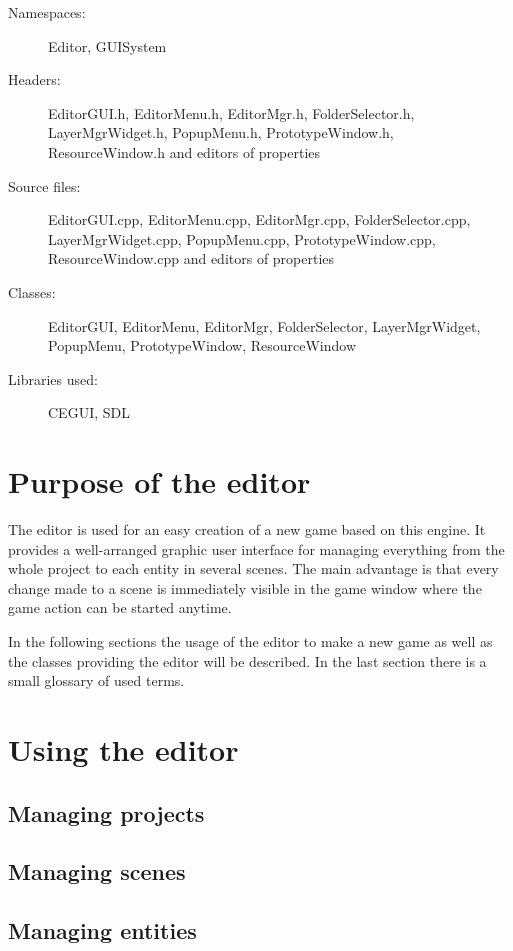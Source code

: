 \begin{description}
  \item[Namespaces:] Editor, GUISystem
  \item[Headers:] EditorGUI.h, EditorMenu.h, EditorMgr.h, FolderSelector.h, LayerMgrWidget.h, PopupMenu.h, PrototypeWindow.h, ResourceWindow\-.h and editors of properties
  \item[Source files:] EditorGUI.cpp, EditorMenu.cpp, EditorMgr.cpp, FolderSelector.cpp, LayerMgrWidget.cpp, PopupMenu.cpp, PrototypeWindow\-.cpp, ResourceWindow.cpp and editors of properties
  \item[Classes:] EditorGUI, EditorMenu, EditorMgr, FolderSelector, LayerMgrWidget, PopupMenu, PrototypeWindow, ResourceWindow
  \item[Libraries used:] CEGUI, SDL
\end{description}

\section{Purpose of the editor}

The editor is used for an easy creation of a new game based on this engine. It provides a well-arranged graphic user interface for managing everything from the whole project to each entity in several scenes. The main advantage is that every change made to a scene is immediately visible in the game window where the game action can be started anytime.

In the following sections the usage of the editor to make a new game as well as the classes providing the editor will be described. In the last section there is a small glossary of used terms.

\section{Using the editor}
\label{sec:editor-using}

\subsection{Managing projects}

\subsection{Managing scenes}

\subsection{Managing entities}

